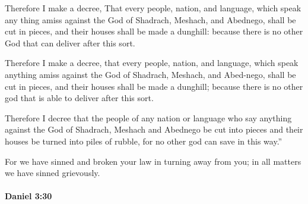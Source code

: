 			Therefore I make a decree, That every people, nation, and language, which speak any thing amiss against the God of Shadrach, Meshach, and Abednego, shall be cut in pieces, and their houses shall be made a dunghill: because there is no other God that can deliver after this sort.

			\begin{versebox}
					\item[BHS] 
					\item[LXX] 
					\item[ASV] Therefore I make a decree, that every people, nation, and language, which speak anything amiss against the God of Shadrach, Meshach, and Abed-nego, shall be cut in pieces, and their houses shall be made a dunghill; because there is no other god that is able to deliver after this sort.
					\item[NIV] Therefore I decree that the people of any nation or language who say anything against the God of Shadrach, Meshach and Abednego be cut into pieces and their houses be turned into piles of rubble, for no other god can save in this way.”
					\item[NRSV] For we have sinned and broken your law in turning away from you; in all matters we have sinned grievously.
			\end{versebox}

		\paragraph{Daniel 3:30} %
			\label{DANIEL-3-30}

